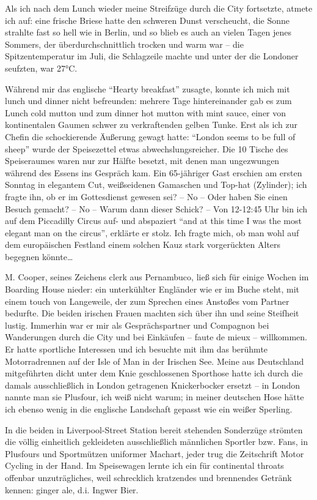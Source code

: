 Als ich nach dem Lunch wieder meine Streifzüge durch die City fortsetzte, atmete ich auf: eine frische Briese hatte den schweren Dunst verscheucht, die Sonne strahlte fast so hell wie in Berlin, und so blieb es auch an vielen Tagen jenes Sommers, der überdurchschnittlich trocken und warm war -- die Spitzentemperatur im Juli, die Schlagzeile machte und unter der die Londoner seufzten, war 27°C.

Während mir das englische \enquote{Hearty breakfast} zusagte, konnte ich mich mit lunch und dinner nicht befreunden: mehrere Tage hintereinander gab es zum Lunch cold mutton und zum dinner hot mutton with mint sauce, einer von kontinentalen Gaumen schwer zu verkraftenden gelben Tunke. Erst als ich zur Chefin die schockierende Äußerung gewagt hatte: \enquote{London seems to be full of sheep} wurde der Speisezettel etwas abwechslungsreicher. Die 10 Tische des Speiseraumes waren nur zur Hälfte besetzt, mit denen man ungezwungen während des Essens ins Gespräch kam. Ein 65-jähriger Gast erschien am ersten Sonntag in elegantem Cut, weißseidenen Gamaschen und Top-hat (Zylinder); ich fragte ihn, ob er im Gottesdienst gewesen sei? -- No -- Oder haben Sie einen Besuch gemacht? -- No -- Warum dann dieser Schick? -- Von 12-12:45 Uhr bin ich auf dem Piccadilly Circus auf- und abspaziert \enquote{and at this time I was the most elegant man on the circus}, erklärte er stolz. Ich fragte mich, ob man wohl auf dem europäischen Festland einem solchen Kauz stark vorgerückten Alters begegnen könnte\dots

M. Cooper, seines Zeichens clerk aus Pernambuco, ließ sich für einige Wochen im Boarding House nieder: ein unterkühlter Engländer wie er im Buche steht, mit einem touch von Langeweile, der zum Sprechen eines Anstoßes vom Partner bedurfte. Die beiden irischen Frauen machten sich über ihn und seine Steifheit lustig. Immerhin war er mir als Gesprächspartner und Compagnon bei Wanderungen durch die City und bei Einkäufen -- faute de mieux -- willkommen. Er hatte sportliche Interessen und ich besuchte mit ihm das berühmte Motorradrennen auf der Isle of Man in der Irischen See. Meine aus Deutschland mitgeführten dicht unter dem Knie geschlossenen Sporthose hatte ich durch die damals ausschließlich in London getragenen Knickerbocker ersetzt -- in London nannte man sie Plusfour, ich weiß nicht warum; in meiner deutschen Hose hätte ich ebenso wenig in die englische Landschaft gepasst wie ein weißer Sperling.

In die beiden in Liverpool-Street Station bereit stehenden Sonderzüge strömten die völlig einheitlich gekleideten ausschließlich männlichen Sportler bzw. Fans, in Plusfours und Sportmützen uniformer Machart, jeder trug die Zeitschrift Motor Cycling in der Hand. Im Speisewagen lernte ich ein für continental throats offenbar unzuträgliches, weil schrecklich kratzendes und brennendes Getränk kennen: ginger ale, d.i. Ingwer Bier.

